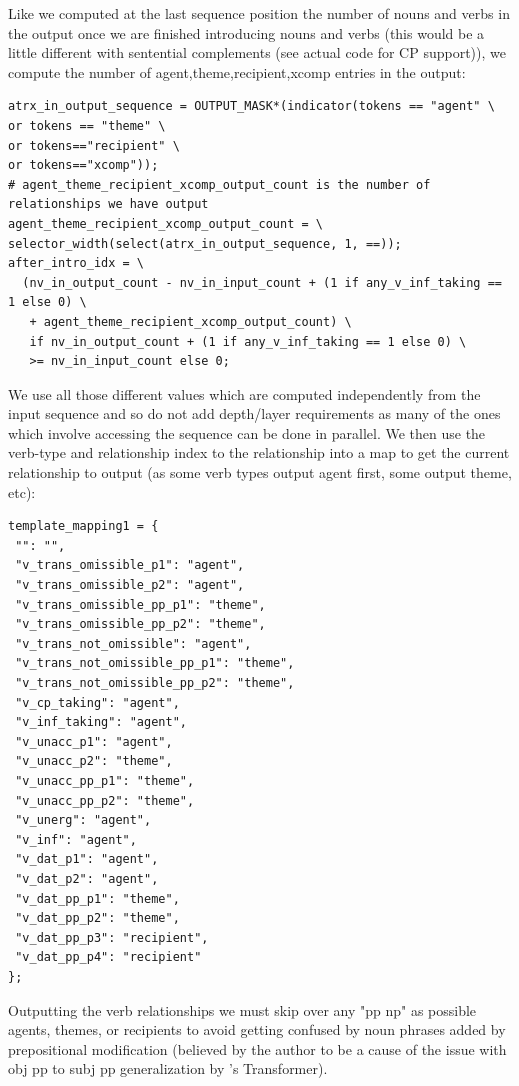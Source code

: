 \documentclass[11pt]{article}
\begin{document}
Like we computed at the last sequence position the number of nouns and verbs in the output once we are finished introducing nouns and verbs (this would be a little different with sentential complements (see actual code for CP support)), we compute the number of agent,theme,recipient,xcomp entries in the output:
\begin{tiny}
\begin{verbatim}
atrx_in_output_sequence = OUTPUT_MASK*(indicator(tokens == "agent" \
or tokens == "theme" \
or tokens=="recipient" \
or tokens=="xcomp"));
# agent_theme_recipient_xcomp_output_count is the number of relationships we have output
agent_theme_recipient_xcomp_output_count = \
selector_width(select(atrx_in_output_sequence, 1, ==));
after_intro_idx = \
  (nv_in_output_count - nv_in_input_count + (1 if any_v_inf_taking == 1 else 0) \
   + agent_theme_recipient_xcomp_output_count) \
   if nv_in_output_count + (1 if any_v_inf_taking == 1 else 0) \
   >= nv_in_input_count else 0;
\end{verbatim}
\end{tiny}
\clearpage
We use all those different values which are computed independently from the input sequence and so do not add depth/layer requirements as many of the ones which involve accessing the sequence can be done in parallel. 
We then use the verb-type and relationship index to the relationship into a map to get the current relationship to output (as some verb types output agent first, some output theme, etc):
\begin{tiny}
\begin{verbatim}
template_mapping1 = {
 "": "",
 "v_trans_omissible_p1": "agent",
 "v_trans_omissible_p2": "agent",
 "v_trans_omissible_pp_p1": "theme",
 "v_trans_omissible_pp_p2": "theme",
 "v_trans_not_omissible": "agent",
 "v_trans_not_omissible_pp_p1": "theme",
 "v_trans_not_omissible_pp_p2": "theme",
 "v_cp_taking": "agent",
 "v_inf_taking": "agent",
 "v_unacc_p1": "agent",
 "v_unacc_p2": "theme",
 "v_unacc_pp_p1": "theme",
 "v_unacc_pp_p2": "theme",
 "v_unerg": "agent",
 "v_inf": "agent",
 "v_dat_p1": "agent",
 "v_dat_p2": "agent",
 "v_dat_pp_p1": "theme",
 "v_dat_pp_p2": "theme",
 "v_dat_pp_p3": "recipient",
 "v_dat_pp_p4": "recipient"
};
\end{verbatim}
\end{tiny}

Outputting the verb relationships we must skip over any "pp np" as possible agents, themes, or recipients to avoid getting confused by noun phrases added by prepositional modification (believed by the author to be a cause of the issue with obj pp to subj pp generalization by \cite{Wu2023}'s Transformer).
\end{document}
